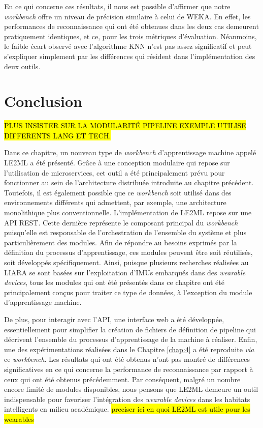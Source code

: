 En ce qui concerne ces résultats, il nous est possible d'affirmer que notre \textit{workbench} offre un niveau de précision similaire à celui de \acs{WEKA}. En effet, les performances de reconnaissance qui ont été obtenues dans les deux cas demeurent pratiquement identiques, et ce, pour les trois métriques d'évaluation. Néanmoins, le faible écart observé avec l'algorithme \acs{KNN} n'est pas assez significatif et peut s'expliquer simplement par les différences qui résident dans l'implémentation des deux outils.

\section{Conclusion}

\hl{PLUS INSISTER SUR LA MODULARITÉ PIPELINE EXEMPLE UTILISE DIFFERENTS LANG ET TECH.}

Dans ce chapitre, un nouveau type de \textit{workbench} d'apprentissage machine appelé \ac{LE2ML} a été présenté. Grâce à une conception modulaire qui repose sur l'utilisation de microservices, cet outil a été principalement prévu pour fonctionner au sein de l'architecture distribuée introduite au chapitre précédent. Toutefois, il est également possible que ce \textit{workbench} soit utilisé dans des environnements différents qui admettent, par exemple, une architecture monolithique plus conventionnelle. L'implémentation de \acs{LE2ML} repose sur une \acs{API} \acs{REST}. Cette dernière représente le composant principal du \textit{workbench} puisqu'elle est responsable de l'orchestration de l'ensemble du système et plus particulièrement des modules. Afin de répondre au besoins exprimés par la définition du processus d'apprentissage, ces modules peuvent être soit réutilisés, soit développés spécifiquement. Ainsi, puisque plusieurs recherches réalisées au \acs{LIARA} se sont basées sur l'exploitation d'\acsp{IMU} embarqués dans des \textit{wearable devices}, tous les modules qui ont été présentés dans ce chapitre ont été principalement conçus pour traiter ce type de données, à l'exception du module d'apprentissage machine.

De plus, pour interagir avec l'\acs{API}, une interface web a été développée, essentiellement pour simplifier la création de fichiers de définition de pipeline qui décrivent l'ensemble du processus d'apprentissage de la machine à réaliser. Enfin, une des expérimentations réalisées dans le Chapitre \ref{chap:4} a été reproduite \textit{via} ce \textit{workbench}. Les résultats qui ont été obtenus n'ont pas montré de différences significatives en ce qui concerne la performance de reconnaissance par rapport à ceux qui ont été obtenus précédemment. Par conséquent, malgré un nombre encore limité de modules disponibles, nous pensons que \acs{LE2ML} demeure un outil indispensable pour favoriser l'intégration des \textit{wearable devices} dans les habitats intelligents en milieu académique.
\hl{preciser ici en quoi LE2ML est utile pour les wearables}
